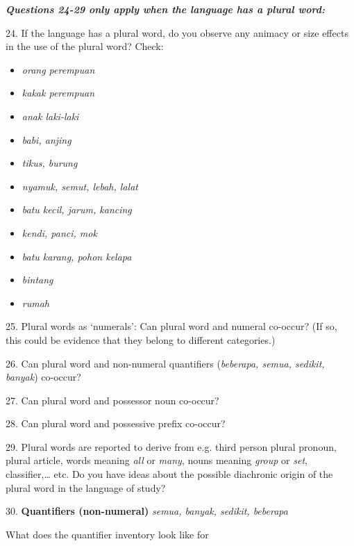 \textbf{\textit{Questions 24-29 only apply when the language has a plural word:}}

24. If the language has a plural word, do you observe any animacy or size effects in the use of the plural word? Check:

\begin{itemize}
\item \textit{orang perempuan }
\item \textit{kakak perempuan }
\item \textit{anak laki-laki }
\item \textit{babi, anjing }
\item \textit{tikus, burung }
\item \textit{nyamuk, semut, lebah, lalat }
\item \textit{batu kecil, jarum, kancing}
\item \textit{kendi, panci, mok}
\item \textit{batu karang, pohon kelapa}
\item \textit{bintang}
\item \textit{rumah}
\end{itemize}
25. Plural words as {\textquoteleft}numerals{\textquoteright}: Can plural word and numeral co-occur? (If so, this could be evidence that they belong to different categories.)

26. Can plural word and non-numeral quantifiers (\textit{beberapa, semua, sedikit, banyak}) co-occur? 

27. Can plural word and possessor noun co-occur? 

28. Can plural word and possessive prefix co-occur? 

29. Plural words are reported to derive from e.g. third person plural pronoun, plural article, words meaning \textit{all} or \textit{many}, nouns meaning \textit{group} or \textit{set}, classifier,{\dots} etc. Do you have ideas about the possible diachronic origin of the plural word in the language of study?

30. \textbf{Quantifiers (non-numeral)} \textit{semua, banyak, sedikit, beberapa}

What does the quantifier inventory look like for

